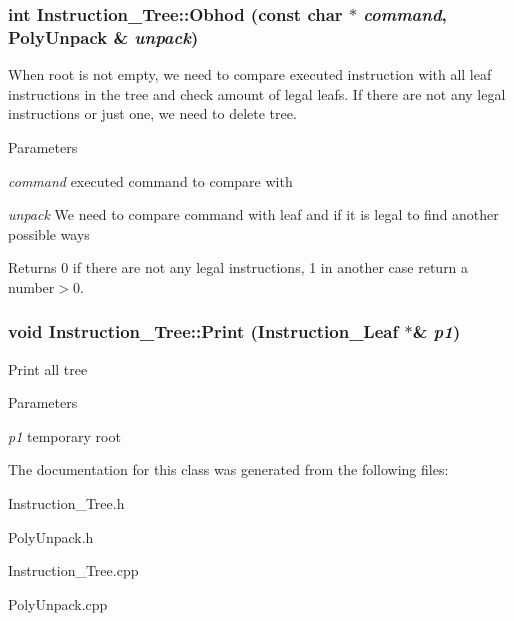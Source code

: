 \hypertarget{classInstruction__Tree_adef0585fdc4173cbd6baabd5bec79a56}{
\subsubsection[{Obhod}]{\setlength{\rightskip}{0pt plus 5cm}int Instruction\_\-Tree::Obhod (const char $\ast$ {\em command}, \/  {\bf PolyUnpack} \& {\em unpack})}}
\label{classInstruction__Tree_adef0585fdc4173cbd6baabd5bec79a56}
When root is not empty, we need to compare executed instruction with all leaf instructions in the tree and check amount of legal leafs. If there are not any legal instructions or just one, we need to delete tree. 
\begin{DoxyParams}{Parameters}
\item[{\em command}]executed command to compare with \item[{\em unpack}]We need to compare command with leaf and if it is legal to find another possible ways \end{DoxyParams}
\begin{DoxyReturn}{Returns}
0 if there are not any legal instructions, 1 in another case return a number$>$0. 
\end{DoxyReturn}
\hypertarget{classInstruction__Tree_ae791340bf25bcf1bf72072d6cc9a5d3e}{
\subsubsection[{Print}]{\setlength{\rightskip}{0pt plus 5cm}void Instruction\_\-Tree::Print ({\bf Instruction\_\-Leaf} $\ast$\& {\em p1})}}
\label{classInstruction__Tree_ae791340bf25bcf1bf72072d6cc9a5d3e}
Print all tree 
\begin{DoxyParams}{Parameters}
\item[{\em p1}]temporary root \end{DoxyParams}


The documentation for this class was generated from the following files:\begin{DoxyCompactItemize}
\item 
Instruction\_\-Tree.h\item 
PolyUnpack.h\item 
Instruction\_\-Tree.cpp\item 
PolyUnpack.cpp\end{DoxyCompactItemize}
